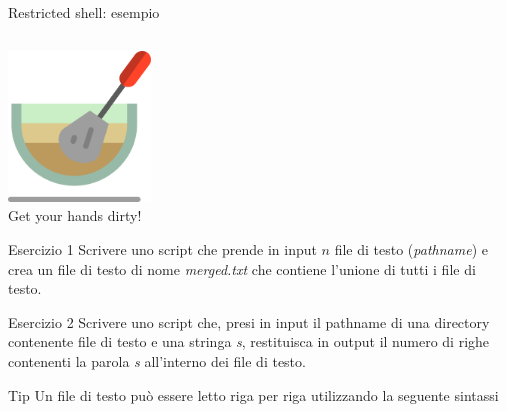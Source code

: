 \documentclass{beamer}
\begin{document}
    \begin{frame}[fragile]{Restricted shell: esempio}
        \inputminted[fontsize=\scriptsize]{bash}{script/restricted-mode.sh}
    \end{frame}

    \begin{frame}[focus]
        \centering
        \includegraphics[height=4cm, keepaspectratio]{images/pasta.pdf} \\
        Get your hands dirty!
    \end{frame}

    \begin{frame}{Esercizio 1}
        Scrivere uno script che prende in input $n$ file di testo (\textit{pathname}) e crea un file
        di testo di nome \textit{merged.txt} che contiene l'unione di tutti i file di testo.
    \end{frame}

    \begin{frame}[fragile]{Esercizio 2}
        Scrivere uno script che, presi in input il pathname
        di una directory contenente file di testo e una stringa \textit{s}, restituisca
        in output il numero di righe contenenti la parola \textit{s} all'interno dei file di testo.

        \begin{alertblock}{Tip}
            Un file di testo può essere letto riga per riga utilizzando la seguente sintassi
            \begin{center}
                \inputminted[fontsize=\scriptsize]{bash}{script/readfile-snippet.sh}
            \end{center}
        \end{alertblock}
    \end{frame}
    
\end{document}
